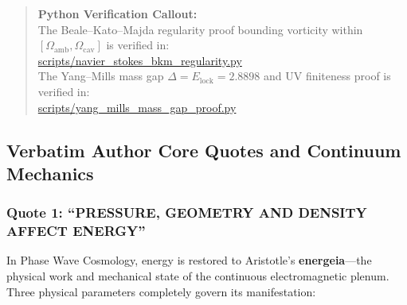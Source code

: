 \documentclass[11pt,a4paper]{article}
\begin{document}
\begin{quote}
\textbf{Python Verification Callout:}\\
The Beale--Kato--Majda regularity proof bounding vorticity within $[\Omega_{\text{amb}}, \Omega_{\text{cav}}]$ is verified in:\\
\url{scripts/navier_stokes_bkm_regularity.py}\\
The Yang--Mills mass gap $\Delta = E_{\text{lock}} = 2.8898$ and UV finiteness proof is verified in:\\
\url{scripts/yang_mills_mass_gap_proof.py}
\end{quote}


\subsection{Verbatim Author Core Quotes and Continuum Mechanics}
\label{subsec:author_quotes}

\subsubsection{Quote 1: ``PRESSURE, GEOMETRY AND DENSITY AFFECT ENERGY''}
\label{subsubsec:quote_pgd}

In Phase Wave Cosmology, energy is restored to Aristotle's \textbf{energeia}---the physical work and mechanical state of the continuous electromagnetic plenum. Three physical parameters completely govern its manifestation:
\end{document}
